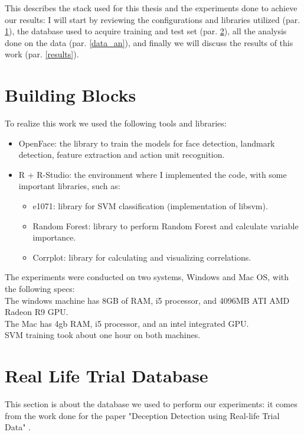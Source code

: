 This describes the stack used for this thesis and the experiments done to achieve our results: I will start by reviewing the configurations and libraries utilized (par. \ref{bb}), the database used to acquire training and test set (par. \ref{rldb}), all the analysis done on the data (par. \ref{data_an}), and finally we will discuss the results of this work (par. \ref{results}).

\section{Building Blocks} \label{bb}
To realize this work we used the following tools and libraries:
\begin{itemize}
	\item OpenFace: the library to train the models for face detection, landmark detection, feature extraction and action unit recognition.
	\item R + R-Studio: the environment where I implemented the code, with some important libraries, such as:
	\begin{itemize}
		\item e1071: library for SVM classification (implementation of libsvm).
		\item Random Forest: library to perform Random Forest and calculate variable importance.
		\item Corrplot: library for calculating and visualizing correlations.
	\end{itemize}
\end{itemize}

The experiments were conducted on two systems, Windows and Mac OS, with the following specs:\\
The windows machine has 8GB of RAM, i5 processor, and 4096MB ATI AMD Radeon R9 GPU. \\
The Mac has 4gb RAM, i5 processor, and an intel integrated GPU.\\
SVM training took about one hour on both machines.

\clearpage

\section{Real Life Trial Database} \label{rldb}
This section is about the database we used to perform our experiments: it comes from the work done for the paper "Deception Detection using Real-life Trial Data" \cite{Perez-Rosas:2015:DDU:2818346.2820758}.

